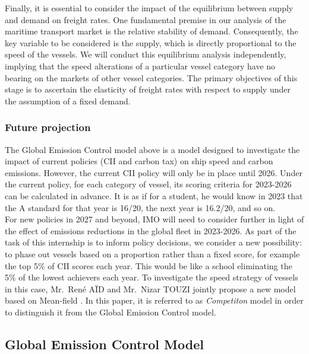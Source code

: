 \documentclass[a4paper,12pt]{article}
\begin{document}
Finally, it is essential to consider the impact of the equilibrium between supply and demand on freight rates.
One fundamental premise in our analysis of the maritime transport market is the relative stability of demand.
Consequently, the key variable to be considered is the supply, which is directly proportional to the speed of the vessels. We will conduct this equilibrium analysis independently, implying that the speed alterations of a particular vessel category have no bearing on the markets of other vessel categories.
The primary objectives of this stage is to ascertain the elasticity of freight rates with respect to supply under the assumption of a fixed demand.\\

\subsubsection{Future projection}
The Global Emission Control model above is a model designed to investigate the impact of current policies (CII and carbon tax) on ship speed and carbon emissions.
However, the current CII policy will only be in place until 2026.
Under the current policy, for each category of vessel, its scoring criteria for 2023-2026 can be calculated in advance.
It is as if for a student, he would know in 2023 that the A standard for that year is 16/20, the next year is 16.2/20, and so on.\\

For new policies in 2027 and beyond, IMO will need to consider further in light of the effect of emissions reductions in the global fleet in 2023-2026.
As part of the task of this internship is to inform policy decisions, we consider a new possibility: to phase out vessels based on a proportion rather than a fixed score, for example the top 5\% of CII scores each year.
This would be like a school eliminating the 5\% of the lowest achievers each year.
To investigate the speed strategy of vessels in this case, Mr.~René AÏD and Mr.~Nizar TOUZI jointly propose a new model based on Mean-field \cite{cardaliaguet2018short}. In this paper, it is referred to as \textit{Competiton} model in order to distinguish it from the Global Emission Control model.

\subsection{Global Emission Control Model}
\end{document}
